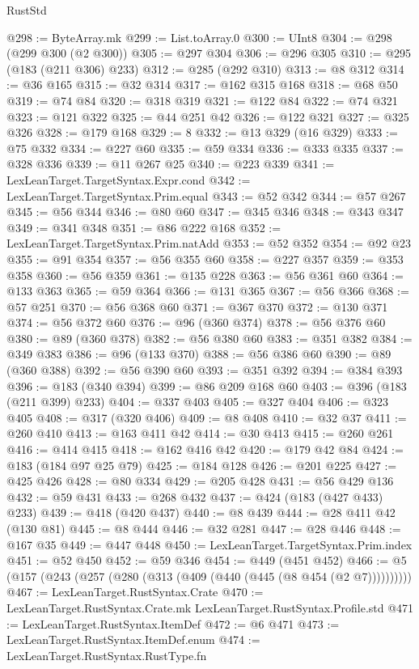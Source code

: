 \begin{lexlean}{RustStd}
\begin{coremodule}
@298 := ByteArray.mk
@299 := List.toArray.{0}
@300 := UInt8
@304 := @298 (@299 @300 (@2 @300))
@305 := @297 @304
@306 := @296 @305
@310 := @295 (@183 (@211 @306) @233)
@312 := @285 (@292 @310)
@313 := @8 @312
@314 := @36 @165
@315 := @32 @314
@317 := @162 @315 @168
@318 := @68 @50
@319 := @74 @84
@320 := @318 @319
@321 := @122 @84
@322 := @74 @321
@323 := @121 @322
@325 := @44 @251 @42
@326 := @122 @321
@327 := @325 @326
@328 := @179 @168
@329 := 8
@332 := @13 @329 (@16 @329)
@333 := @75 @332
@334 := @227 @60
@335 := @59 @334
@336 := @333 @335
@337 := @328 @336
@339 := @11 @267 @25
@340 := @223 @339
@341 := LexLeanTarget.TargetSyntax.Expr.cond
@342 := LexLeanTarget.TargetSyntax.Prim.equal
@343 := @52 @342
@344 := @57 @267
@345 := @56 @344
@346 := @80 @60
@347 := @345 @346
@348 := @343 @347
@349 := @341 @348
@351 := @86 @222 @168
@352 := LexLeanTarget.TargetSyntax.Prim.natAdd
@353 := @52 @352
@354 := @92 @23
@355 := @91 @354
@357 := @56 @355 @60
@358 := @227 @357
@359 := @353 @358
@360 := @56 @359
@361 := @135 @228
@363 := @56 @361 @60
@364 := @133 @363
@365 := @59 @364
@366 := @131 @365
@367 := @56 @366
@368 := @57 @251
@370 := @56 @368 @60
@371 := @367 @370
@372 := @130 @371
@374 := @56 @372 @60
@376 := @96 (@360 @374)
@378 := @56 @376 @60
@380 := @89 (@360 @378)
@382 := @56 @380 @60
@383 := @351 @382
@384 := @349 @383
@386 := @96 (@133 @370)
@388 := @56 @386 @60
@390 := @89 (@360 @388)
@392 := @56 @390 @60
@393 := @351 @392
@394 := @384 @393
@396 := @183 (@340 @394)
@399 := @86 @209 @168 @60
@403 := @396 (@183 (@211 @399) @233)
@404 := @337 @403
@405 := @327 @404
@406 := @323 @405
@408 := @317 (@320 @406)
@409 := @8 @408
@410 := @32 @37
@411 := @260 @410
@413 := @163 @411 @42
@414 := @30 @413
@415 := @260 @261
@416 := @414 @415
@418 := @162 @416 @42
@420 := @179 @42 @84
@424 := @183 (@184 @97 @25 @79)
@425 := @184 @128
@426 := @201 @225
@427 := @425 @426
@428 := @80 @334
@429 := @205 @428
@431 := @56 @429 @136
@432 := @59 @431
@433 := @268 @432
@437 := @424 (@183 (@427 @433) @233)
@439 := @418 (@420 @437)
@440 := @8 @439
@444 := @28 @411 @42 (@130 @81)
@445 := @8 @444
@446 := @32 @281
@447 := @28 @446
@448 := @167 @35
@449 := @447 @448
@450 := LexLeanTarget.TargetSyntax.Prim.index
@451 := @52 @450
@452 := @59 @346
@454 := @449 (@451 @452)
@466 := @5 (@157 (@243 (@257 (@280 (@313 (@409 (@440 (@445 (@8 @454 (@2 @7))))))))))
@467 := LexLeanTarget.RustSyntax.Crate
@470 := LexLeanTarget.RustSyntax.Crate.mk LexLeanTarget.RustSyntax.Profile.std
@471 := LexLeanTarget.RustSyntax.ItemDef
@472 := @6 @471
@473 := LexLeanTarget.RustSyntax.ItemDef.enum
@474 := LexLeanTarget.RustSyntax.RustType.fn

\end{coremodule}
\end{lexlean}
